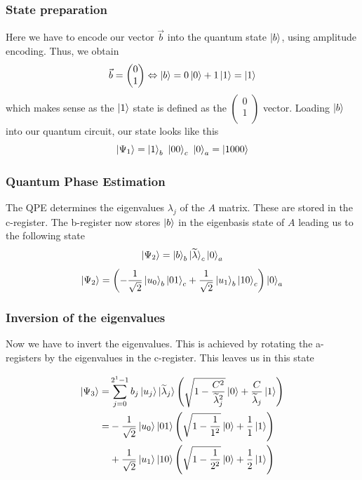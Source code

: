 \subsubsection{State preparation}
    Here we have to encode our vector $\vec{b}$ into the quantum state $\ket{b}$, using amplitude encoding.
    Thus, we obtain
    \begin{equation}
    \vec{b} = \begin{pmatrix} 0\\ 1\\ \end{pmatrix}
    \Leftrightarrow \ket{b} = 0 \ket{0} + 1 \ket{1} = \ket{1} 
    \end{equation}
    which makes sense as the $\ket 1$ state is defined as the $\begin{pmatrix} 0\\ 1\\ \end{pmatrix}$ vector.
    Loading $\ket b$ into our quantum circuit, our state looks like this
    \begin{equation}
    \ket{\Psi_1} = \ket{1}_b\ \ket{00}_c\ \ket{0}_a = \ket{1000}
    \end{equation}

\subsubsection{Quantum Phase Estimation}
    The QPE determines the eigenvalues $\lambda_j$ of the $A$ matrix. 
    These are stored in the c-register. 
    The b-register now stores $\ket b$ in the eigenbasis state of $A$ leading us to the following state
    \begin{equation}
    \ket{\Psi_2} = \ket{b}_b \ket{\widetilde{\lambda}}_c\ket{0}_a
    \end{equation}
    \begin{equation}
    \ket{\Psi_2} =\left(-\frac{1}{\sqrt{2}} \ket{u_0}_b \ket{01}_c +\frac{1}{\sqrt{2}} \ket{u_1}_b \ket{10}_c \right)  \ket{0}_a
    \end{equation}


\subsubsection{Inversion of the eigenvalues}
    Now we have to invert the eigenvalues. 
    This is achieved by rotating the a-registers by the eigenvalues in the c-register.
    This leaves us in this state

    \begin{equation}
     \begin{split}
    \ket{\Psi_3} =& \sum_{j=0}^{2^{1}-1} b_j \ket{u_j} \ket{\widetilde{\lambda}_j} \left(\sqrt{1-\frac{C^2}{\widetilde{\lambda}_j^2}}\ket{0} + \frac{C}{\widetilde{\lambda}_j} \ket{1}\right) \\
    =&-\frac{1}{\sqrt{2}} \ket{u_0} \ket{01}\left(\sqrt{1-\frac{1}{1^2}}\ket{0} + \frac{1}{1} \ket{1}\right) \\
    &+\frac{1}{\sqrt{2}}  \ket{u_1} \ket{10} \left(\sqrt{1-\frac{1}{2^2}}\ket{0} + \frac{1}{2} \ket{1}\right)
     \end{split}
    \end{equation}

